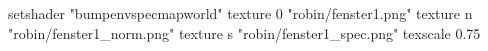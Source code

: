 setshader "bumpenvspecmapworld"
   texture 0 "robin/fenster1.png"
   texture n "robin/fenster1_norm.png"
   texture s "robin/fenster1_spec.png"
texscale 0.75